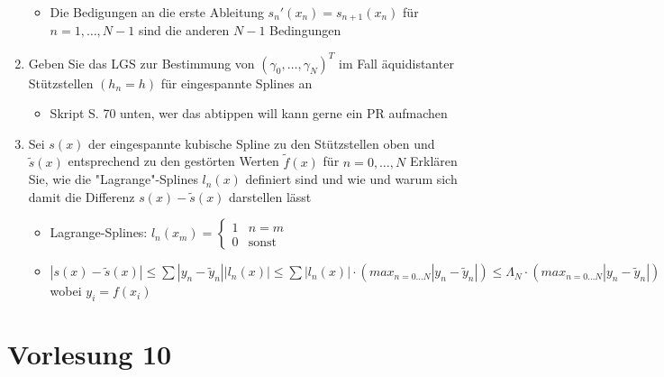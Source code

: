 \documentclass[]{article}
\begin{document}
\begin{enumerate}
\begin{itemize}
				\item Die Bedigungen an die erste Ableitung $s_n'(x_n) = s_{n+1}(x_n)$ für $n=1, \dots , N-1$ sind die anderen $N-1$ Bedingungen
			\end{itemize}
		\item Geben Sie das LGS zur Bestimmung von $(\gamma_0, \dots , \gamma_N)^T$ im Fall äquidistanter Stützstellen $(h_n = h)$ für eingespannte Splines an
			\begin{itemize}
				\item Skript S. 70 unten, wer das abtippen will kann gerne ein PR aufmachen %
			\end{itemize}
		\item Sei $s(x)$ der eingespannte kubische Spline zu den Stützstellen oben und $\tilde{s}(x)$ entsprechend zu den gestörten Werten $\tilde{f}(x)$ für $n = 0, \dots , N$ Erklären Sie, wie die "Lagrange"-Splines $l_n(x)$ definiert sind und wie und warum sich damit die Differenz $s(x) - \tilde{s}(x)$ darstellen lässt
			\begin{itemize}
				\item Lagrange-Splines: $l_n(x_m) = \begin{cases} 1 & n = m \\0 & \text{sonst} \end{cases}$
				\item $|s(x) - \tilde{s}(x)| \leq \sum |y_n - \tilde{y}_n| |l_n(x)| \leq \sum |l_n(x)| \cdot ( max_{n=0\dots N} |y_n - \tilde{y}_n| ) \leq \Lambda_N \cdot ( max_{n=0\dots N} |y_n - \tilde{y}_n| )$ wobei $y_i = f(x_i)$
			\end{itemize}
	\end{enumerate}	

\section{Vorlesung 10}
\end{document}
